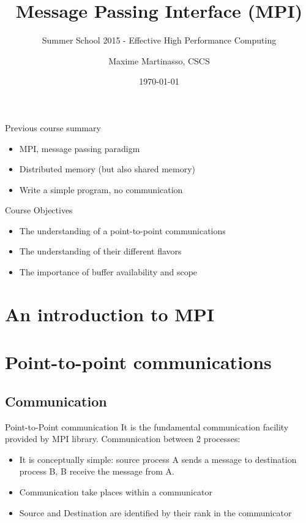 \documentclass[aspectratio=43]{beamer}
\author{Maxime Martinasso, CSCS}
\title{Message Passing Interface (MPI)}
\subtitle{Summer School 2015 - Effective High Performance Computing}
\date{\today}
\begin{document}
\cscstitle

\begin{frame}{Previous course summary}
\begin{itemize}
\item MPI, message passing paradigm
\item Distributed memory (but also shared memory)
\item Write a simple program, no communication
\end{itemize}
\end{frame}

\begin{frame}{Course Objectives}
\begin{itemize}
\item The understanding of a point-to-point communications
\item The understanding of their different flavors
\item The importance of buffer availability and scope
\end{itemize}
\end{frame}


\section{An introduction to MPI}
\section{Point-to-point communications}


\subsection{Communication}

\begin{frame}{Point-to-Point communication}
It is the fundamental communication facility provided by MPI library.
Communication between 2 processes:
\begin{itemize}
\item It is conceptually simple: source process A sends a message to destination process B, B receive the message from A.
\item Communication take places within a communicator
\item Source and Destination are identified by their rank in the communicator
\end{itemize}
\end{frame}
\end{document}
